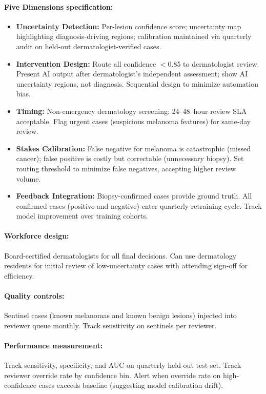 \paragraph{Five Dimensions specification:}
\begin{itemize}
    \item \textbf{Uncertainty Detection:} Per-lesion confidence score; uncertainty map highlighting diagnosis-driving regions; calibration maintained via quarterly audit on held-out dermatologist-verified cases.
    \item \textbf{Intervention Design:} Route all confidence $<$0.85 to dermatologist review. Present AI output after dermatologist's independent assessment; show AI uncertainty regions, not diagnosis. Sequential design to minimize automation bias.
    \item \textbf{Timing:} Non-emergency dermatology screening: 24--48~hour review SLA acceptable. Flag urgent cases (suspicious melanoma features) for same-day review.
    \item \textbf{Stakes Calibration:} False negative for melanoma is catastrophic (missed cancer); false positive is costly but correctable (unnecessary biopsy). Set routing threshold to minimize false negatives, accepting higher review volume.
    \item \textbf{Feedback Integration:} Biopsy-confirmed cases provide ground truth. All confirmed cases (positive and negative) enter quarterly retraining cycle. Track model improvement over training cohorts.
\end{itemize}

\paragraph{Workforce design:}
Board-certified dermatologists for all final decisions. Can use dermatology residents for initial review of low-uncertainty cases with attending sign-off for efficiency.

\paragraph{Quality controls:}
Sentinel cases (known melanomas and known benign lesions) injected into reviewer queue monthly. Track sensitivity on sentinels per reviewer.

\paragraph{Performance measurement:}
Track sensitivity, specificity, and AUC on quarterly held-out test set. Track reviewer override rate by confidence bin. Alert when override rate on high-confidence cases exceeds baseline (suggesting model calibration drift).

